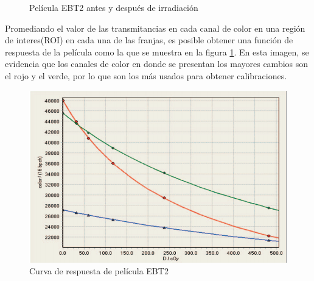 \begin{figure}[H]
	\centering
	\hfill
	\caption{Película EBT2 antes y después de irradiación}
\end{figure}

Promediando el valor de las transmitancias en cada canal de color en una región de interes(ROI) en cada una de las franjas, es posible obtener una función de respuesta de la película como la que se muestra en la figura \ref{fig:curvaRespuesta}. En esta imagen, se evidencia que los canales de color en donde se presentan los mayores cambios son el rojo y el verde, por lo que son los más usados para obtener calibraciones.\\

\begin{figure}[H]
	\centering
	\includegraphics[width=0.5\linewidth]{images/respses.png}
	\caption{Curva de respuesta de película EBT2\cite{manualEBT2}}
	\label{fig:curvaRespuesta}
\end{figure}

